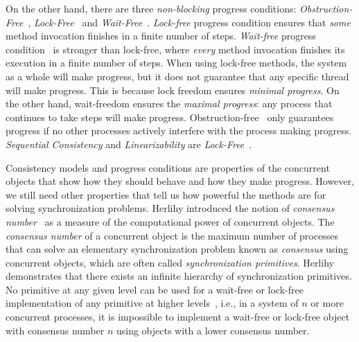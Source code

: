 On the other hand, there are three \textit{non-blocking} progress conditions: \textit{Obstruction-Free}~\cite{DBLP_conf_icdcs_HerlihyLM03}, \textit{Lock-Free}~\cite{DBLP_journals_toplas_HerlihyW90} and \textit{Wait-Free}~\cite{DBLP_journals_toplas_Herlihy91}. 
\textit{Lock-free} progress condition ensures that \textit{some} method invocation finishes in a finite number of steps. \textit{Wait-free} progress condition~\cite{DBLP_journals_toplas_Herlihy91} is stronger than lock-free, where \textit{every} method invocation finishes its execution in a finite number of steps. When using lock-free methods, the system as a whole will make progress, but it does not guarantee that any specific thread will make progress. This is because lock freedom ensures \textit{minimal progress}. On the other hand, wait-freedom ensures the \textit{maximal progress}: any process that continues to take steps will make progress. Obstruction-free~\cite{DBLP_conf_icdcs_HerlihyLM03} only guarantees progress if no other processes actively interfere with the process making progress. \textit{Sequential Consistency} and \textit{Linearizability} are \textit{Lock-Free}~\cite{DBLP_journals_toplas_HerlihyW90}.

Consistency models and progress conditions are properties of the concurrent objects that show how they should behave and how they make progress. However, we still need other properties that tell us how powerful the methods are for solving synchronization problems. Herlihy introduced the notion of \textit{consensus number}~\cite{DBLP_journals_toplas_Herlihy91} as a measure of the computational power of concurrent objects. The \textit{consensus number} of a concurrent object is the maximum number of processes that can solve an elementary synchronization problem known as \textit{consensus} using concurrent objects, which are often called \textit{synchronization primitives}. Herlihy demonstrates that there exists an infinite hierarchy of synchronization primitives. No primitive at any given level can be used for a wait-free or lock-free implementation of any primitive at higher levels~\cite{DBLP_journals_toplas_Herlihy91}, i.e., in a system of \(n\) or more concurrent processes, it is impossible to implement a wait-free or lock-free object with consensus number \(n\) using objects with a lower consensus number.

